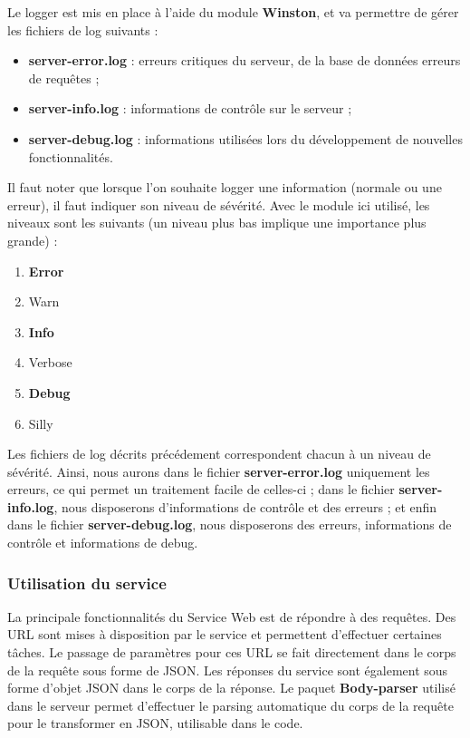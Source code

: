 Le logger est mis en place à l'aide du module \textbf{Winston}, et va permettre de gérer les fichiers de log suivants :
\begin{itemize}
    \item \textbf{server-error.log} : erreurs critiques du serveur, de la base de données erreurs de requêtes ;
    \item \textbf{server-info.log} : informations de contrôle sur le serveur ;
    \item \textbf{server-debug.log} : informations utilisées lors du développement de nouvelles fonctionnalités.
\end{itemize}

Il faut noter que lorsque l'on souhaite logger une information (normale ou une erreur), il faut indiquer son niveau de sévérité. Avec le module ici utilisé, les niveaux sont les suivants (un niveau plus bas implique une importance plus grande) :
\begin{enumerate}
    \item \textbf{Error}
    \item Warn
    \item \textbf{Info}
    \item Verbose
    \item \textbf{Debug}
    \item Silly
\end{enumerate}

Les fichiers de log décrits précédement correspondent chacun à un niveau de sévérité. Ainsi, nous aurons dans le fichier \textbf{server-error.log} uniquement les erreurs, ce qui permet un traitement facile de celles-ci ; dans le fichier \textbf{server-info.log}, nous disposerons d'informations de contrôle et des erreurs ; et enfin dans le fichier \textbf{server-debug.log}, nous disposerons des erreurs, informations de contrôle et informations de debug.

\subsubsection{Utilisation du service}

La principale fonctionnalités du Service Web est de répondre à des requêtes. Des URL sont mises à disposition par le service et permettent d'effectuer certaines tâches. Le passage de paramètres pour ces URL se fait directement dans le corps de la requête sous forme de JSON.
Les réponses du service sont également sous forme d'objet JSON dans le corps de la réponse.
Le paquet \textbf{Body-parser} utilisé dans le serveur permet d'effectuer le parsing automatique du corps de la requête pour le transformer en JSON, utilisable dans le code.

